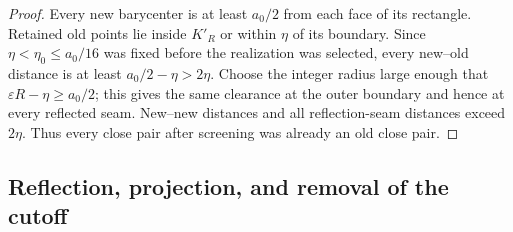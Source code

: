 \begin{proof}
Every new barycenter is at least $a_0/2$ from each face of its
rectangle.  Retained old points lie inside $K'_R$ or within $\eta$
of its boundary.  Since $\eta<\eta_0\le a_0/16$ was fixed before
the realization was selected, every new--old distance is at least
$a_0/2-\eta>2\eta$.
Choose the integer radius large enough that
$\varepsilon R-\eta\ge a_0/2$; this gives the same clearance at
the outer boundary and hence at every reflected seam.
New--new distances and all reflection-seam distances exceed $2\eta$.
Thus every close pair after screening was already an old close pair.

\end{proof}

\subsection{Reflection, projection, and removal of the cutoff}

